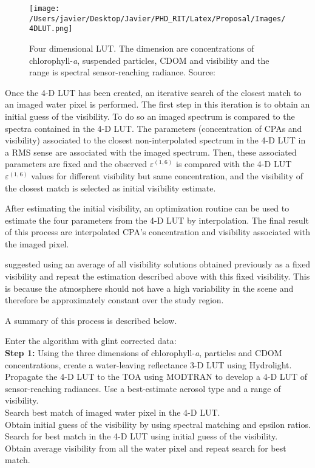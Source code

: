 \begin{figure}[htb]
  \centering
  \texttt{[image: /Users/javier/Desktop/Javier/PHD\_RIT/Latex/Proposal/Images/4DLUT.png]}
  \caption{Four dimensional LUT. The dimension are concentrations of chlorophyll-{\it a}, suspended particles, CDOM and visibility and the range is spectral sensor-reaching radiance. Source: \cite{GeraceThesis}}
  \label{fig:4DLUT} 
\end{figure}
Once the 4-D LUT has been created, an iterative search of the closest match to an imaged water pixel is performed. The first step in this iteration is to obtain an initial guess of the visibility. To do so an imaged spectrum is compared to the spectra contained in the 4-D LUT. The parameters (concentration of CPAs and visibility) associated to the closest non-interpolated spectrum in the 4-D LUT in a RMS sense are associated with the imaged spectrum. Then, these associated parameters are fixed and the observed $\varepsilon^{(1,6)}$ is compared with the 4-D LUT $\varepsilon^{(1,6)}$ values for different visibility but same concentration, and the visibility of the closest match is selected as initial visibility estimate.

After estimating the initial visibility, an optimization routine can be used to estimate the four parameters from the 4-D LUT by interpolation. The final result of this process are interpolated CPA's concentration and visibility associated with the imaged pixel.

\cite{GeraceThesis} suggested using an average of all visibility solutions obtained previously as a fixed visibility and repeat the estimation described above with this fixed visibility. This is because the atmosphere should not have a high variability in the scene and therefore be approximately constant over the study region.

A summary of this process is described below.

Enter the algorithm with glint corrected data:\\
{\bf Step 1:} Using the three dimensions of chlorophyll-{\it a}, particles and CDOM concentrations, create a water-leaving reflectance 3-D LUT using Hydrolight.\\
 Propagate the 4-D LUT to the TOA using MODTRAN to develop a 4-D LUT of sensor-reaching radiances. Use a best-estimate aerosol type and a range of visibility.\\
 Search best match of imaged water pixel in the 4-D LUT.\\
 Obtain initial guess of the visibility by using spectral matching and epsilon ratios.\\
 Search for best match in the 4-D LUT using initial guess of the visibility.\\
 Obtain average visibility from all the water pixel and repeat search for best match.\\

